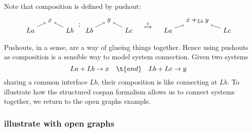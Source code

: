 \documentclass{amsart}
\newcommand{\csp}[3]{#1 + #3 \to #2}
\theoremstyle{remark}
\theoremstyle{definition}
\begin{document}
Note that composition is defined by pushout:
%
\[
  \begin{tikzpicture}
    \begin{scope}
    \node (1) at (0,0) {\( La \)};
    \node (2) at (1,0.5) {\( x \)};
    \node (3) at (2,0) {\( Lb \)};
    \node (4) at (3,0) {\( Lb \)};
    \node (5) at (4,0.5) {\( y \)};
    \node (6) at (5,0) {\( Lc \)};
    \node (7) at (2.5,0.25) {\( ; \)};
    \draw [->] (1) to node [] {\scriptsize{\(  \)}} (2);
    \draw [->] (3) to node [] {\scriptsize{\(  \)}} (2);
    \draw [->] (4) to node [] {\scriptsize{\(  \)}} (5);
    \draw [->] (6) to node [] {\scriptsize{\(  \)}} (5);
    \end{scope}
    \begin{scope}[shift={(6,0)}]
    \node (1) at (0,0.25) {\( \xmapsto{\circ} \)};
    \end{scope}
    \begin{scope}[shift={(7,0)}]
    \node (1) at (0,0) {\( La \)};
    \node (2) at (1.5,0.5) {\( x +_{Lb} y \)};
    \node (3) at (3,0) {\( Lc \)};
     \draw [->] (1) to node [] {\scriptsize{\(  \)}} (2);
    \draw [->] (3) to node [] {\scriptsize{\(  \)}} (2); 
    \end{scope}
  \end{tikzpicture}
\]
% 

Pushouts, in a sense, are a way of glueing things
together. Hence using pushouts as composition is a sensible way to model
system connection. Given two systems
%
\[
  \csp{La}{x}{Lb}
  \quad
  \t{ and }
  \quad
  \csp{Lb}{y}{Lc}
\]
% 
sharing a common interface $ Lb $, their composition is like
connecting at $ Lb $. To illustrate how the structured cospan
formalism allows us to connect systems together, we return to the open
graphs example.

\subsubsection{illustrate with open graphs}
\label{sec-2-3-3}
\end{document}
